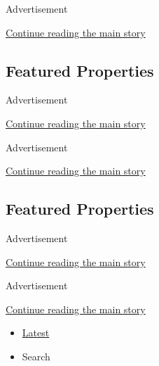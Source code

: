 Advertisement

\protect\hyperlink{after-mid2}{Continue reading the main story}

\hypertarget{featured-properties}{%
\subsection{Featured Properties}\label{featured-properties}}

Advertisement

\protect\hyperlink{after-feat1}{Continue reading the main story}

Advertisement

\protect\hyperlink{after-feat2}{Continue reading the main story}

\hypertarget{featured-properties-1}{%
\subsection{Featured Properties}\label{featured-properties-1}}

Advertisement

\protect\hyperlink{after-feat3}{Continue reading the main story}

Advertisement

\protect\hyperlink{after-feat4}{Continue reading the main story}

\begin{itemize}
\tightlist
\item
  \protect\hyperlink{stream-panel}{Latest}
\item
  Search
\end{itemize}

